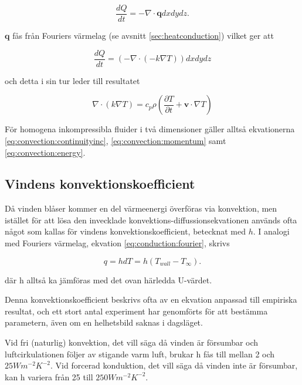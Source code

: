 \begin{equation}
\frac{dQ}{dt} = - \nabla \cdot \mathbf{q} dxdydz.
\end{equation}

$\mathbf{q}$ fås från Fouriers värmelag (se avsnitt \ref{sec:heatconduction}) vilket ger att

\begin{equation}
\label{reynoldsenergytwo}
\frac{dQ}{dt} = \left( - \nabla \cdot \left( -k \nabla T \right) \right)dxdydz
\end{equation}

och detta i sin tur leder till resultatet

\begin{equation}
\label{eq:convection:energy}\boxed{ \; \; \;
\nabla \cdot \left( k \nabla T \right) = c_p \rho \left( \frac{\partial T}{\partial t} + \mathbf{v}\cdot \nabla T\right)
\; \; \;}
\end{equation}

För homogena inkompressibla fluider i två dimensioner gäller alltså ekvationerna
\eqref{eq:convection:continuityinc}, \eqref{eq:convection:momentum} samt \eqref{eq:convection:energy}.

\subsection{Vindens konvektionskoefficient}

Då vinden blåser kommer en del värmeenergi överföras via konvektion, men istället för att lösa den invecklade konvektions-diffussionsekvationen används ofta något som kallas för vindens konvektionskoefficient, betecknat med $h$. I analogi med Fouriers värmelag, ekvation \ref{eq:conduction:fourier}, skrivs

\begin{equation}\boxed{ \; \; \;
q = hdT = h\left( T_{wall} - T_{\infty}\right).
\; \; \;}\end{equation}

där h alltså ka jämföras med det ovan härledda U-värdet. 

Denna konvektionskoefficient beskrivs ofta av en ekvation anpassad till empiriska resultat, och ett stort antal experiment har genomförts för att bestämma parametern, även om en helhetsbild saknas i dagsläget.

Vid fri (naturlig) konvektion, det vill säga då vinden är försumbar och luftcirkulationen följer av stigande varm luft, brukar h fås till mellan 2 och $\unit{25}{Wm^{-2}K^{-2}}$. Vid forcerad konduktion, det vill säga då vinden inte är försumbar, kan h variera från 25 till $\unit{250}{Wm^{-2}K^{-2}}$. \cite{ASHRAE09}

